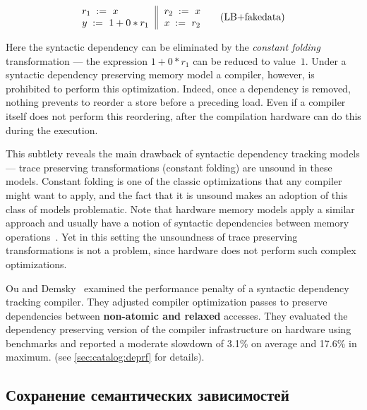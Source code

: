 \begin{equation*}
\inarrII{
  \readInst{}{r_1}{x}           \\
  \writeInst{}{y}{1 + 0 * r_1}  \\
}{
  \readInst{}{r_2}{x}      \\
  \writeInst{}{x}{r_2}     \\
}
\tag{LB+fakedata}\label{ex:lb+fakedata}
\end{equation*}

Here the syntactic dependency can be eliminated 
by the \emph{constant folding} transformation --- 
the expression $1 + 0 * r_1$ can be reduced to value~$1$.
Under a syntactic dependency preserving memory model 
a compiler, however, is prohibited to perform this optimization. 
Indeed, once a dependency is removed, nothing prevents 
to reorder a store before a preceding load. 
Even if a compiler itself does not perform this reordering,
after the compilation hardware can 
do this during the execution.   

This subtlety reveals the main drawback of 
syntactic dependency tracking models --- 
trace preserving transformations
(\eg constant folding) are unsound in these models. 
Constant folding is one of the classic optimizations 
that any compiler might want to apply, 
and the fact that it is unsound  
makes an adoption of this class of models problematic.
Note that hardware memory models apply a similar approach 
and usually have a notion of syntactic dependencies between 
memory operations~\cite{Sarkar-al:PLDI11, Alglave-al:TOPLAS14, Pulte-al:POPL18}.
Yet in this setting the unsoundness of 
trace preserving transformations is not a problem,
since hardware does not perform such complex optimizations.

Ou and Demsky~\cite{Ou-Demsky:OOPSLA18} examined
the performance penalty of a syntactic 
dependency tracking compiler.
They adjusted compiler optimization passes to preserve
dependencies between \textbf{non-atomic and relaxed} accesses.
They evaluated the dependency preserving 
version of the \LLVM compiler infrastructure 
on  hardware using \SPECCPU benchmarks
and reported a moderate slowdown of 
3.1\% on average and 17.6\% in maximum. 
(see \ref{sec:catalog:deprf} for details).

\subsection{Сохранение семантических зависимостей}
\label{sec:analysis:sdeprf}

